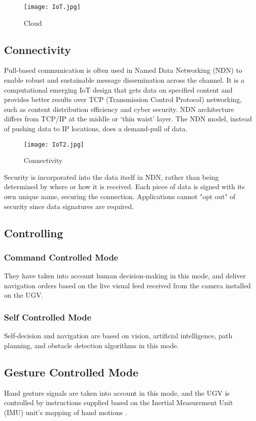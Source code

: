 \documentclass[conference,a4paper]{IEEEtran}
\begin{document}
\begin{figure}[ht]
\centering
\texttt{[image: IoT.jpg]}
\caption{Cloud}
\label{Fig: IoT2}
\end{figure}

\subsection{Connectivity}
Pull-based communication is often used in Named Data Networking (NDN) to enable robust and sustainable message dissemination across the channel. It is a computational emerging IoT design that gets data on specified content and provides better results over TCP (Transmission Control Protocol) networking, such as content distribution efficiency and cyber security. NDN architecture differs from TCP/IP at the middle or ‘thin waist’ layer. The NDN model, instead of pushing data to IP locations, does a demand-pull of data. \cite{1}

\begin{figure}[ht]
\centering
\texttt{[image: IoT2.jpg]}
\caption{Connectivity}
\label{Fig: IoT3}
\end{figure}

Security is incorporated into the data itself in NDN, rather than being determined by where or how it is received. Each piece of data is signed with its own unique name, securing the connection. Applications cannot "opt out" of security since data signatures are required.\cite{11}

\subsection{Controlling}
\subsubsection{Command Controlled Mode}
They have taken into account human decision-making in this mode, and deliver navigation orders based on the live visual feed received from the camera installed on the UGV.\cite{9}

\subsubsection{Self Controlled Mode}
Self-decision and navigation are based on vision, artificial intelligence, path planning, and obstacle detection algorithms in this mode. \cite{9}

\subsection{Gesture Controlled Mode}
Hand gesture signals are taken into account in this mode, and the UGV is controlled by instructions supplied based on the Inertial Measurement Unit (IMU) unit's mapping of hand motions \cite{9}.
\end{document}

